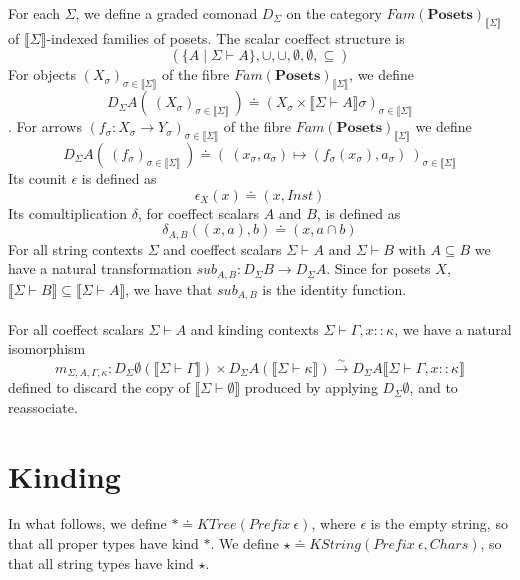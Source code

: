 \documentclass{article}
\newcommand{\mbf}{\mathbf}
\newcommand{\sem}[1]{\llbracket #1 \rrbracket}
\begin{document}
For each $\Sigma$, we define a graded comonad $D_{\Sigma}$ on the category $\mathit{Fam}(\mbf{Posets})_{\sem{\Sigma}}$ of
$\sem{\Sigma}$-indexed families of posets. The scalar coeffect structure is 
$$( \{ A \mid \Sigma \vdash A \}, \cup, \cup, \emptyset, \emptyset, \subseteq)$$
For objects $(X_\sigma)_{\sigma \in \sem{\Sigma}}$ of the fibre $\mathit{Fam}(\mbf{Posets})_{\sem{\Sigma}}$, we define $$D_{\Sigma} A(~(X_\sigma)_{\sigma \in \sem{\Sigma}}~) \doteq (X_\sigma \times \sem{\Sigma \vdash A}\sigma)_{\sigma \in \sem{\Sigma}}$$.
For arrows $(f_\sigma : X_\sigma \to Y_\sigma)_{\sigma \in \sem{\Sigma}}$ of the fibre $\mathit{Fam}(\mbf{Posets})_{\sem{\Sigma}}$ we define $$D_{\Sigma} A(~(f_\sigma)_{\sigma \in \sem{\Sigma}}~) \doteq (~(x_\sigma, a_\sigma) \mapsto (f_\sigma(x_\sigma),a_\sigma)~)_{\sigma \in \sem{\Sigma}}$$
Its counit $\epsilon$ is defined as $$\epsilon_X(x) \doteq (x,\mathit{Inst})$$
Its comultiplication $\delta$, for coeffect scalars $A$ and $B$, is defined as $$\delta_{A,B}((x,a),b) \doteq (x, a \cap b)$$
For all string contexts $\Sigma$ and coeffect scalars $\Sigma \vdash A$ and $\Sigma \vdash B$ with $A \subseteq B$ we have a natural transformation $\mathit{sub}_{A,B} : D_{\Sigma} B \to D_{\Sigma } A$. Since for posets $X$, $\sem{\Sigma \vdash B} \subseteq \sem{\Sigma \vdash A}$, we have that $\mathit{sub}_{A,B}$ is the identity function.\\~\\
For all coeffect scalars $\Sigma \vdash A$ and kinding contexts $\Sigma \vdash \Gamma,x :: \kappa$, we have a natural isomorphism $$m_{\Sigma,A,\Gamma,\kappa} : D_{\Sigma} \emptyset(\sem{\Sigma \vdash \Gamma}) \times D_{\Sigma} A( \sem{\Sigma \vdash \kappa} ) \overset{\sim}{\to} D_{\Sigma} A \sem{\Sigma \vdash \Gamma,x :: \kappa}$$ defined to discard the copy of $\sem{\Sigma \vdash \emptyset}$ produced by applying $D_{\Sigma} \emptyset$, and to reassociate.
\section*{Kinding}

In what follows, we define $\ast \doteq \mathit{KTree}(\mathit{Prefix}~\epsilon)$, where $\epsilon$ is the empty string, so that all proper types have kind $\ast$. We define $\star \doteq \mathit{KString}(\mathit{Prefix}~\epsilon, \mathit{Chars})$, so that all string types have kind $\star$.
\end{document}
